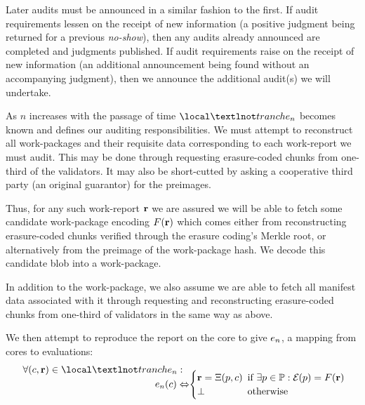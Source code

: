 Later audits must be announced in a similar fashion to the first. If audit requirements lessen on the receipt of new information (\ie a positive judgment being returned for a previous \emph{no-show}), then any audits already announced are completed and judgments published. If audit requirements raise on the receipt of new information (\ie an additional announcement being found without an accompanying judgment), then we announce the additional audit(s) we will undertake.

As $n$ increases with the passage of time $\local¬tranche\sub{n}$ becomes known and defines our auditing responsibilities. We must attempt to reconstruct all work-packages and their requisite data corresponding to each work-report we must audit. This may be done through requesting erasure-coded chunks from one-third of the validators. It may also be short-cutted by asking a cooperative third party (\eg an original guarantor) for the preimages.

Thus, for any such work-report $\mathbf{r}$ we are assured we will be able to fetch some candidate work-package encoding $F(\mathbf{r})$ which comes either from reconstructing erasure-coded chunks verified through the erasure coding's Merkle root, or alternatively from the preimage of the work-package hash. We decode this candidate blob into a work-package.

In addition to the work-package, we also assume we are able to fetch all manifest data associated with it through requesting and reconstructing erasure-coded chunks from one-third of validators in the same way as above.

We then attempt to reproduce the report on the core to give $e_{n}$, a mapping from cores to evaluations: \vskip -7pt
\begin{equation}
  \begin{aligned}
    \forall \tup{\cX, \wrX} \in \local¬tranche\sub{n} :\ \ &\\[-10pt]
    e\sub{n}(\cX) \Leftrightarrow &\begin{cases}
      \wrX = \computereport(p, \cX)\!\!\! &\when \exists p \in \workpackage: \encode{p} = F(\wrX) \\
      \bot &\otherwise
    \end{cases}
  \end{aligned}\!\!
\end{equation}


